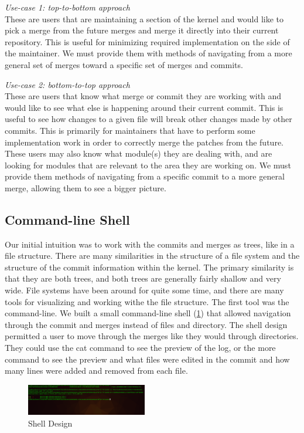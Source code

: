\documentclass[conference, draftclsnofoot]{IEEEtran}
\begin{document}
\textit{Use-case 1: top-to-bottom approach}\\
These are users that are maintaining a section of the kernel and would like to
pick a merge from the future merges and merge it directly into their current
repository. This is useful for minimizing required implementation on the side
of the maintainer. We must provide them with methods of navigating from a more
general set of merges toward a specific set of merges and commits.

\textit{Use-case 2: bottom-to-top approach}\\
These are users that know what merge or commit they are working with and would
like to see what else is happening around their current commit. This is useful
to see how changes to a given file will break other changes made by other
commits. This is primarily for maintainers that have to perform some
implementation work in order to correctly merge the patches from the future.
These users may also know what module(s) they are dealing with, and are looking
for modules that are relevant to the area they are working on. We must provide
them methods of navigating from a specific commit to a more general merge,
allowing them to see a bigger picture.


\subsection{Command-line Shell}

Our initial intuition was to work with the commits and merges as trees, like in
a file structure. There are many similarities in the structure of a file system
and the structure of the commit information within the kernel. The primary
similarity is that they are both trees, and both trees are generally fairly
shallow and very wide. File systems have been around for quite some time, and
there are many tools for visualizing and working withe the file structure. The
first tool was the command-line. We built a small command-line shell
(\ref{fig:shell}) that allowed navigation through the commit and merges instead
of files and directory. The shell design permitted a user to move through the
merges like they would through directories. They could use the cat command to
see the preview of the log, or the more command to see the preview and what
files were edited in the commit and how many lines were added and removed from
each file.

\begin{figure}[h]
	\centering
	\includegraphics[width=0.47\textwidth]{figures/shell.png}
	\caption{Shell Design}
	\label{fig:shell}
\end{figure}
\end{document}
